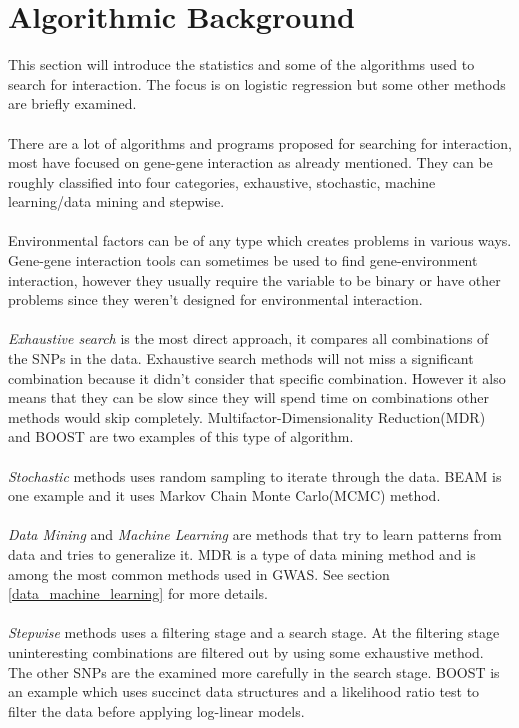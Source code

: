 \documentclass[10pt,a4paper]{report}
\begin{document}
\section{Algorithmic Background}
This section will introduce the statistics and some of the algorithms used to search for interaction. The focus is on logistic regression but some other methods are briefly examined.\\
\\
There are a lot of algorithms and programs proposed for searching for interaction, most have focused on gene-gene interaction as already mentioned. They can be roughly classified into four categories, exhaustive, stochastic, machine learning/data mining and stepwise\cite{fast_high_order_cluster}.	\\
\\
Environmental factors can be of any type which creates problems in various ways\cite{gene_enviroment_2013}. Gene-gene interaction tools can sometimes be used to find gene-environment interaction, however they usually require the variable to be binary or have other problems since they weren't designed for environmental interaction.\cite{gene_enviroment_2013}\\
\\
\emph{Exhaustive search} is the most direct approach, it compares all combinations of the SNPs in the data. Exhaustive search methods will not miss a significant combination because it didn't consider that specific combination. However it also means that they can be slow since they will spend time on combinations other methods would skip completely. Multifactor-Dimensionality Reduction(MDR)\cite{mdr_2001} and BOOST\cite{boost_gene_gene} are two examples of this type of algorithm.\\
\\
\emph{Stochastic} methods uses random sampling to iterate through the data. BEAM\cite{beam_2007} is one example and it uses Markov Chain Monte Carlo(MCMC) method.\\
\\
\emph{Data Mining} and \emph{Machine Learning} are methods that try to learn patterns from data and tries to generalize it. MDR\cite{mdr_2001} is a type of data mining method and is among the most common methods used in GWAS. See section \ref{data_machine_learning} for more details.\\
\\
\emph{Stepwise} methods uses a filtering stage and a search stage. At the filtering stage uninteresting combinations are filtered out by using some exhaustive method. The other SNPs are the examined more carefully in the search stage. BOOST\cite{boost_gene_gene} is an example which uses succinct data structures and a likelihood ratio test to filter the data before applying log-linear models.
\end{document}
